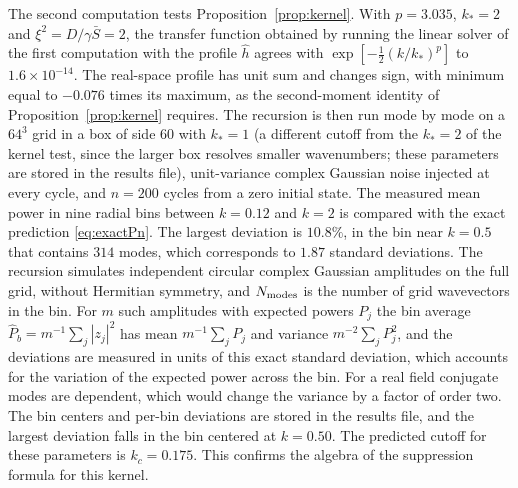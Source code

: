 \documentclass[11pt]{article}
\theoremstyle{definition}
\theoremstyle{remark}
\newcommand{\Sb}{\bar{S}}
\begin{document}
The second computation tests Proposition~\ref{prop:kernel}. With $p=3.035$, $k_*=2$ and $\xi^2=D/\gamma\Sb=2$, the transfer function obtained by running the linear solver of the first computation with the profile $\hat h$ agrees with $\exp[-\frac12(k/k_*)^p]$ to $1.6\times10^{-14}$. The real-space profile has unit sum and changes sign, with minimum equal to $-0.076$ times its maximum, as the second-moment identity of Proposition~\ref{prop:kernel} requires. The recursion is then run mode by mode on a $64^3$ grid in a box of side $60$ with $k_*=1$ (a different cutoff from the $k_*=2$ of the kernel test, since the larger box resolves smaller wavenumbers; these parameters are stored in the results file), unit-variance complex Gaussian noise injected at every cycle, and $n=200$ cycles from a zero initial state. The measured mean power in nine radial bins between $k=0.12$ and $k=2$ is compared with the exact prediction \eqref{eq:exactPn}. The largest deviation is $10.8\%$, in the bin near $k=0.5$ that contains $314$ modes, which corresponds to $1.87$ standard deviations. The recursion simulates independent circular complex Gaussian amplitudes on the full grid, without Hermitian symmetry, and $N_{\rm modes}$ is the number of grid wavevectors in the bin. For $m$ such amplitudes with expected powers $P_j$ the bin average $\widehat P_b=m^{-1}\sum_j|z_j|^2$ has mean $m^{-1}\sum_jP_j$ and variance $m^{-2}\sum_jP_j^2$, and the deviations are measured in units of this exact standard deviation, which accounts for the variation of the expected power across the bin. For a real field conjugate modes are dependent, which would change the variance by a factor of order two. The bin centers and per-bin deviations are stored in the results file, and the largest deviation falls in the bin centered at $k=0.50$. The predicted cutoff for these parameters is $k_c=0.175$. This confirms the algebra of the suppression formula for this kernel.
\end{document}
